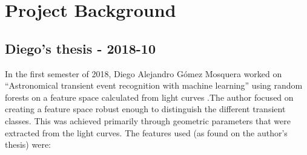\section{Project Background}

\subsection{Diego's thesis - 2018-10}

In the first semester of 2018, Diego Alejandro G\'omez Mosquera worked on ``Astronomical transient event recognition with machine learning'' using random forests on a feature space calculated from light curves \cite{diegoThesis}.The author focused on creating a feature space robust enough to distinguish the different transient classes. This was achieved primarily through geometric parameters that were extracted from the light curves. The features used (as found on the author's thesis) were: 
